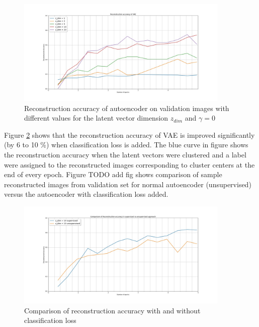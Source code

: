 \documentclass{uai2021} %
\begin{document}
\begin{figure}[!t]
\centering
\includegraphics[width=4in]{reconstruction_accuracy.jpg}
\caption{Reconstruction accuracy of autoencoder on validation images with different values for the latent vector dimension  $z_{dim}$ and $\gamma = 0$}
\label{reconstruction_accuracy}
\end{figure}

Figure \ref{reconstruction_accuracy_sup_vs_unsup} shows that the reconstruction accuracy of VAE is improved significantly  (by 6 to 10 \%) when classification loss is added.
The blue curve in figure shows the reconstruction accuracy when the latent vectors were clustered and a label were assigned to the reconstructed images corresponding to  cluster centers at the end of every epoch.
Figure TODO add fig shows comparison of sample reconstructed images from validation set for normal autoencoder (unsupervised) versus the autoencoder with classification loss added.

\begin{figure}[!t]
\centering
\includegraphics[width=4in]{reconstruction_accuracy_compare_supervised_vs_unsuprevised.jpg}
\caption{Comparison of reconstruction accuracy with and without classification loss }
\label{reconstruction_accuracy_sup_vs_unsup}
\end{figure}
\end{document}
